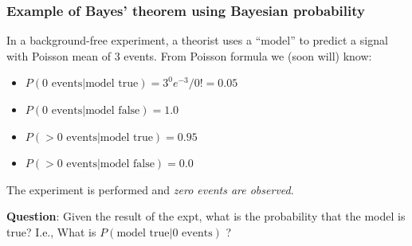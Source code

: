 \documentclass[9pt]{beamer}
\newif\ifmynote
\newcommand\mynote[1]{%
\ifmynote \textbf{#1} \else \fi
}
\begin{document}
\begin{frame}
 \frametitle{Example  of Bayes' theorem using Bayesian probability}
 
 \mynote{Écrire au tableau}
 
 In a background-free experiment, a theorist uses a ``model'' to
predict a signal with Poisson mean of 3 events. From Poisson
formula we (soon will) know:

\begin{itemize}
 \item $P(\text{0 events} | \text{model true}) = 3^0 e^{-3}/0! = 0.05$
 \item $P(\text{0 events} | \text{model false}) = 1.0$
 \item $P(>\text{0 events} | \text{model true}) = 0.95$
 \item $P(>\text{0 events} | \text{model false}) = 0.0$
\end{itemize}

The experiment is performed and \emph{zero events are observed}.

\vspace{10pt}

\textbf{Question}: Given the result of the expt, what is the probability that
the model is true? I.e., What is $P(\text{model true} | \text{0 events})$ ?

\vspace{10pt}


\end{frame}
\end{document}
